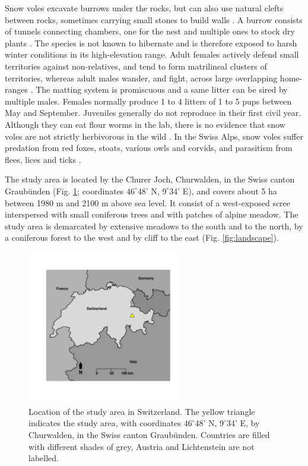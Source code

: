 Snow voles excavate burrows under the rocks, but can also use natural clefts between rocks, sometimes carrying small stones to build walls \parencite{Niederer2008}. A burrow consists of tunnels connecting chambers, one for the nest and multiple ones to stock dry plants \parencite{Janeau1997}. The species is not known to hibernate and is therefore exposed to harsh winter conditions in its high-elevation range. 
Adult females actively defend small territories against non-relatives, and tend to form matrilineal clusters of territories, whereas adult males wander, and fight, across large overlapping home-ranges \parencite{Luque-larena2004, Garcia-Navas2016}. The matting system is promiscuous and a same litter can be sired by multiple males. Females normally produce 1 to 4 litters of 1 to 5 pups between May and September. Juveniles generally do not reproduce in their first civil year. 
Although they can eat flour worms in the lab, there is no evidence that snow voles are not strictly herbivorous in the wild \parencite{Janeau1997}. In the Swiss Alps, snow voles suffer predation from red foxes, stoats, various owls and corvids, and parasitism from flees, lices and ticks \parencite{Janeau1997, Martinoli2001}.

The study area is located by the Churer Joch, Churwalden, in the Swiss canton Graub\"unden (Fig. \ref{fig:map}; coordinates $46^{\circ}$48' N, $9^{\circ}$34' E), and covers about 5 ha between 1980 m and 2100 m above sea level. It consist of a west-exposed scree interspersed with small coniferous trees and with patches of alpine meadow. The study area is demarcated by extensive meadows to the south and to the north, by a coniferous forest to the west and by cliff to the east (Fig. \ref{fig:landscape}). 
\begin{figure}[ht]
	\centering
	\includegraphics[width=0.6\textwidth]{FiguresGeneral/Map/figure/map-1.pdf}
	\caption{Location of the study area in Switzerland. The yellow triangle indicates the study area, with coordinates $46^{\circ}$48' N, $9^{\circ}$34' E, by Churwalden, in the Swiss canton Graub\"unden. Countries are filled with different shades of grey, Austria and Lichtenstein are not labelled.}
	\label{fig:map}
\end{figure}

